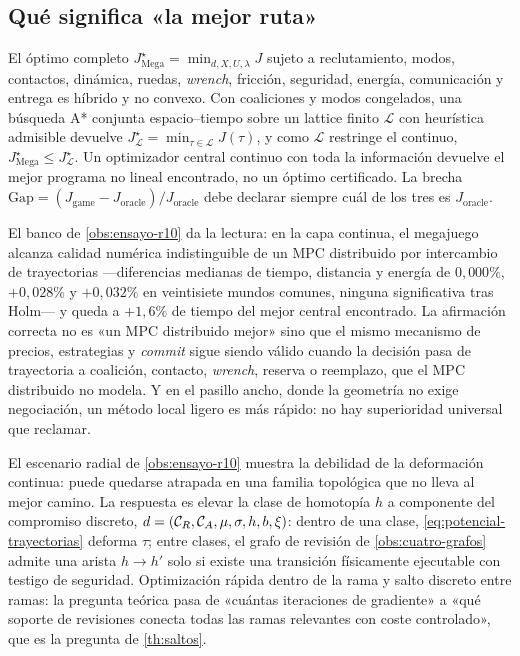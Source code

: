 \subsection{Qué significa «la mejor ruta»}

\begin{definicion}
\label{def:jerarquia-optimos}
El óptimo completo $J^\star_{\mathrm{Mega}}=\min_{d,X,U,\lambda}J$ sujeto a
reclutamiento, modos, contactos, dinámica, ruedas, \emph{wrench}, fricción,
seguridad, energía, comunicación y entrega es híbrido y no convexo. Con
coaliciones y modos congelados, una búsqueda A* conjunta espacio--tiempo sobre
un lattice finito $\mathcal L$ con heurística admisible devuelve
$J^\star_{\mathcal L}=\min_{\tau\in\mathcal L}J(\tau)$, y como $\mathcal L$
restringe el continuo, $J^\star_{\mathrm{Mega}}\le J^\star_{\mathcal L}$. Un
optimizador central continuo con toda la información devuelve el mejor
programa no lineal encontrado, no un óptimo certificado. La brecha
$\mathrm{Gap}=(J_{\mathrm{game}}-J_{\mathrm{oracle}})/J_{\mathrm{oracle}}$
debe declarar siempre cuál de los tres es $J_{\mathrm{oracle}}$.
\end{definicion}

\begin{observacion}
\label{obs:lectura-r10}
El banco de \cref{obs:ensayo-r10} da la lectura: en la capa continua, el
megajuego alcanza calidad numérica indistinguible de un MPC distribuido por
intercambio de trayectorias —diferencias medianas de tiempo, distancia y
energía de $0{,}000\%$, $+0{,}028\%$ y $+0{,}032\%$ en veintisiete mundos
comunes, ninguna significativa tras Holm— y queda a $+1{,}6\%$ de tiempo del
mejor central encontrado. La afirmación correcta no es «un MPC distribuido
mejor» sino que el mismo mecanismo de precios, estrategias y
\emph{commit} sigue siendo válido cuando la decisión pasa de trayectoria a
coalición, contacto, \emph{wrench}, reserva o reemplazo, que el MPC
distribuido no modela. Y en el pasillo ancho, donde la geometría no exige
negociación, un método local ligero es más rápido: no hay superioridad
universal que reclamar.
\end{observacion}

\begin{observacion}
\label{obs:homotopia}
El escenario radial de \cref{obs:ensayo-r10} muestra la debilidad de la
deformación continua: puede quedarse atrapada en una familia topológica que no
lleva al mejor camino. La respuesta es elevar la clase de homotopía $h$ a
componente del compromiso discreto, $d=(\mathcal{C}_R,\mathcal{C}_A,\mu,\sigma,h,b,\xi)$:
dentro de una clase, \eqref{eq:potencial-trayectorias} deforma $\tau$; entre
clases, el grafo de revisión de \cref{obs:cuatro-grafos} admite una arista
$h\to h'$ solo si existe una transición físicamente ejecutable con testigo de
seguridad. Optimización rápida dentro de la rama y salto discreto entre ramas:
la pregunta teórica pasa de «cuántas iteraciones de gradiente» a «qué soporte
de revisiones conecta todas las ramas relevantes con coste controlado», que es
la pregunta de \cref{th:saltos}.
\end{observacion}

